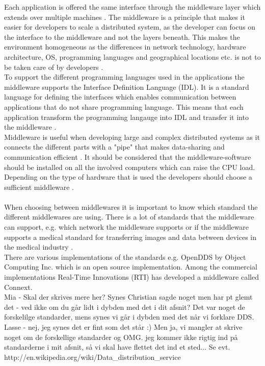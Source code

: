 \documentclass[Main]{subfiles}
\begin{document}
Each application is offered the same interface through the middleware layer which extends over multiple machines \cite[p. 3]{Tanenbaum}. The middleware is a principle that makes it easier for developers to scale a distributed system, as the developer can focus on the interface to the middleware and not the layers beneath. This makes the environment homogeneous as the differences in network technology, hardware architecture, OS, programming languages and geographical locations etc. is not to be taken care of by developers \cite{DDS-slides} \cite[p. 68]{Coulouris}.
\\
To support the different programming languages used in the applications the middleware supports the Interface Definition Language (IDL). It is a standard language for defining the interfaces which enables communication between applications that do not share programming language. This means that each application transform the programming langauge into IDL and transfer it into the middleware \cite{DDS-slides} \cite{RTI} \cite{wiki-idl}.
\\
Middleware is useful when developing large and complex distributed systems as it connects the different parts with a "pipe" that makes data-sharing and communication efficient \cite{DDS-slides} \cite[p. 68]{Coulouris}. It should be considered that the middleware-software should be installed on all the involved computers which can raise the CPU load. Depending on the type of hardware that is used the developers should choose a sufficient middleware \cite{DDS-slides}.
\\
\\
When choosing between middlewares it is important to know which standard the different middlewares are using. There is a lot of standards that the middleware can support, e.g. which network the middleware supports or if the middleware supports a medical standard for transferring images and data between devices in the medical industry \cite{DDS_slides}.\\
There are various implementations of the standards e.g. OpenDDS by Object Computing Inc. which is an open source implementation. Among the commercial implementations Real-Time Innovations (RTI) has developed a middleware called Connext.\\

Mia - Skal der skrives mere her? Synes Christian sagde noget men har pt glemt det - ved ikke om du går lidt i dybden med det i dit afsnit? Det var noget de forskelilge standarder, mens synes vi går i dybden med det når vi forklare DDS.
Lasse - nej, jeg synes det er fint som det står :) Men ja, vi mangler at skrive noget om de forskellige standarder og OMG. jeg kommer ikke rigtig ind på standarderne i mit afsnit, så vi skal have flettet det ind et sted... Se evt. http://en.wikipedia.org/wiki/Data_distribution_service 
\end{document}
